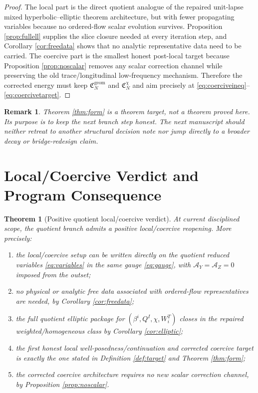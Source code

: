 \documentclass[11pt]{article}
\newtheorem{remark}{Remark}
\newtheorem{theorem}{Theorem}
\begin{document}
\begin{proof}
The local part is the direct quotient analogue of the repaired unit-lapse mixed hyperbolic--elliptic theorem architecture, but with fewer propagating variables because no ordered-flow scalar evolution survives. Proposition \ref{prop:fullell} supplies the slice closure needed at every iteration step, and Corollary \ref{cor:freedata} shows that no analytic representative data need to be carried. The coercive part is the smallest honest post-local target because Proposition \ref{prop:noscalar} removes any scalar correction channel while preserving the old trace/longitudinal low-frequency mechanism. Therefore the corrected energy must keep \(\mathfrak C_N^{\mathrm{geom}}\) and \(\mathfrak C_N^\chi\) and aim precisely at \eqref{eq:coerciveineq}--\eqref{eq:coercivetarget}.
\end{proof}

\begin{remark}
Theorem \ref{thm:form} is a theorem \emph{target}, not a theorem proved here. Its purpose is to keep the next branch step honest. The next manuscript should neither retreat to another structural decision note nor jump directly to a broader decay or bridge-redesign claim.
\end{remark}

\section{Local/Coercive Verdict and Program Consequence}

\begin{theorem}[Positive quotient local/coercive verdict]
\label{thm:verdict}
At current disciplined scope, the quotient branch admits a positive local/coercive reopening. More precisely:
\begin{enumerate}
    \item the local/coercive setup can be written directly on the quotient reduced variables \eqref{eq:variables} in the same gauge \eqref{eq:gauge}, with \(\mathcal A_Y=\mathcal A_Z=0\) imposed from the outset;
    \item no physical or analytic free data associated with ordered-flow representatives are needed, by Corollary \ref{cor:freedata};
    \item the full quotient elliptic package for \((\beta^i,Q^I,\chi,W_i^T)\) closes in the repaired weighted/homogeneous class by Corollary \ref{cor:elliptic};
    \item the first honest local well-posedness/continuation and corrected coercive target is exactly the one stated in Definition \ref{def:target} and Theorem \ref{thm:form};
    \item the corrected coercive architecture requires no new scalar correction channel, by Proposition \ref{prop:noscalar}.
\end{enumerate}
\end{theorem}
\end{document}
